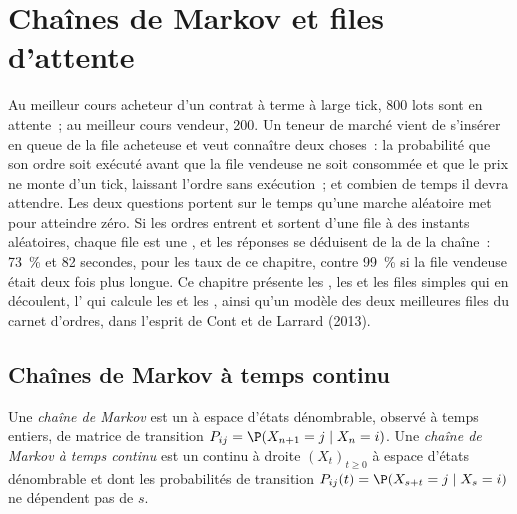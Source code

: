 \chapter{Chaînes de Markov et files d'attente}\label{ch:qm:markov-chains-and-queues}

Au meilleur cours acheteur d'un contrat à terme à large tick, 800 lots sont en attente~; au meilleur cours vendeur, 200. Un teneur de marché vient de
s'insérer en queue de la file acheteuse et veut connaître deux choses~: la probabilité que son ordre soit exécuté
avant que la file vendeuse ne soit consommée et que le prix ne monte d'un tick, laissant l'ordre sans exécution~; et combien de temps
il devra attendre. Les deux questions portent sur le temps qu'une marche aléatoire met pour atteindre zéro. Si les ordres entrent et
sortent d'une file à des instants aléatoires, chaque file est une , et les réponses se déduisent de
la  de la chaîne~: 73~\% et 82 secondes, pour les taux de ce chapitre, contre 99~\% si la file vendeuse
était deux fois plus longue. Ce chapitre présente les , les 
et les files simples qui en découlent, l' qui calcule les  et
les , ainsi qu'un modèle des deux meilleures files du carnet d'ordres, dans l'esprit de Cont et de Larrard
(2013).

\section{Chaînes de Markov à temps continu}

\begin{definition}\label{def:qm:markov-chains-and-queues:ctmc}
Une \emph{chaîne de Markov} est un  à espace d'états dénombrable, observé
à temps entiers, de matrice de transition $P_{ij} = \P(X_{n+1} = j \mid X_n = i)$. Une
\emph{chaîne de Markov à temps continu} est un  continu à droite
$(X_t)_{t\ge0}$ à espace d'états dénombrable et dont les probabilités de transition $P_{ij}(t) = \P(X_{s+t}
= j \mid X_s = i)$ ne dépendent pas de $s$.
\end{definition}

